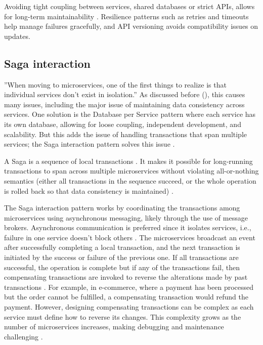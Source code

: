\documentclass[]{final}
\begin{document}
Avoiding tight coupling between services, shared databases or strict
APIs, allows for long-term maintainability \cite{robbagby_microservice_nodate}. Resilience patterns
such as retries and timeouts help manage failures gracefully,
and API versioning avoids compatibility issues on updates.

\subsection{Saga interaction}

”When moving to microservices, one of the first things to realize is that
individual services don’t exist in isolation.”\cite{noauthor_saga_nodate} As discussed
before {\hypersetup{linkcolor=teal}(\pageref{microservice_issue})}, this causes
many issues, including the major issue of maintaining data consistency across
services. One solution is the Database per Service pattern where each service
has its own database, allowing for loose coupling, independent development,
and scalability. But this adds the issue of handling transactions that span
multiple services; the Saga interaction pattern solves this issue \cite{noauthor_microservices_nodate}.

A Saga is a sequence of local transactions \cite{noauthor_microservices_nodate}.
It makes it possible for long-running transactions to span across multiple
microservices without violating all-or-nothing semantics (either all
transactions in the sequence succeed, or the whole operation is rolled back
so that data consistency is maintained) \cite{noauthor_saga_nodate}.

\label{saga_events}
The Saga interaction pattern works by coordinating the transactions among
microservices using asynchronous messaging, likely through the use of message
brokers. Asynchronous communication is preferred since it isolates services,
i.e., failure in one service doesn't block others \cite{noauthor_managing_nodate}.
The microservices
broadcast an event after successfully completing a local transaction, and
the next transaction is initiated by the success or failure of the
previous one. If all transactions are successful, the operation is complete
but if any of the transactions fail, then compensating transactions are
invoked to reverse the alterations made by past transactions \cite{noauthor_saga_nodateaws}.
For example, in e-commerce, where a payment has been processed but the order
cannot be fulfilled, a compensating transaction would refund the payment.
However, designing compensating transactions can be complex as each service
must define how to reverse its changes. This complexity grows as the number
of microservices increases, making debugging and maintenance challenging \cite{noauthor_saga_nodateaws}.
\end{document}
